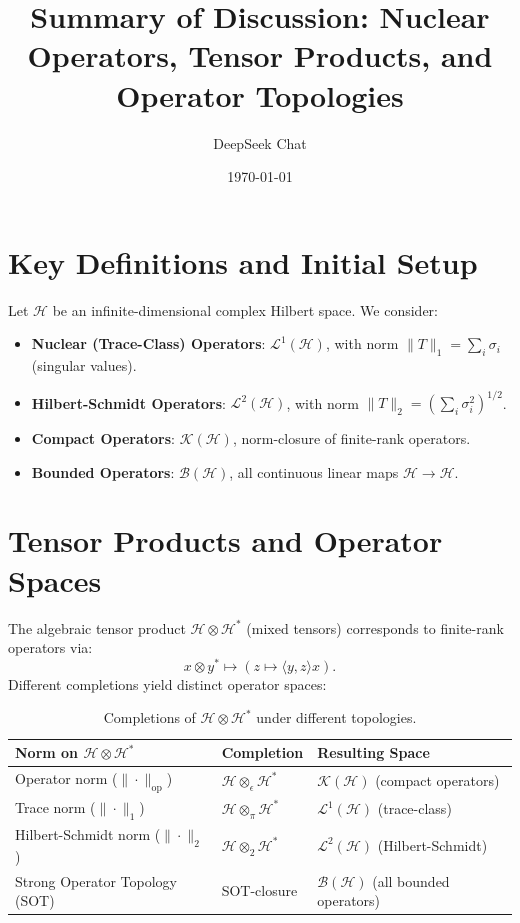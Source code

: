 \documentclass[aps,preprint]{revtex4}
\title{Summary of Discussion: Nuclear Operators, Tensor Products, and Operator Topologies}
\author{DeepSeek Chat}
\date{\today}
\newcommand{\HH}{\mathcal{H}}
\newcommand{\BB}{\mathcal{B}}
\newcommand{\KK}{\mathcal{K}}
\newcommand{\LL}{\mathcal{L}}
\newcommand{\ot}{\otimes}
\begin{document}
\maketitle

\section{Key Definitions and Initial Setup}
Let \(\HH\) be an infinite-dimensional complex Hilbert space. We consider:
\begin{itemize}
    \item \textbf{Nuclear (Trace-Class) Operators}: \(\LL^1(\HH)\), with norm \(\|T\|_1 = \sum_i \sigma_i\) (singular values).
    \item \textbf{Hilbert-Schmidt Operators}: \(\LL^2(\HH)\), with norm \(\|T\|_2 = \left(\sum_i \sigma_i^2\right)^{1/2}\).
    \item \textbf{Compact Operators}: \(\KK(\HH)\), norm-closure of finite-rank operators.
    \item \textbf{Bounded Operators}: \(\BB(\HH)\), all continuous linear maps \(\HH \to \HH\).
\end{itemize}

\section{Tensor Products and Operator Spaces}
The algebraic tensor product \(\HH \ot \HH^*\) (mixed tensors) corresponds to finite-rank operators via:
\[
x \ot y^* \mapsto \left( z \mapsto \langle y, z \rangle x \right).
\]
Different completions yield distinct operator spaces:
\begin{table}[h]
    \centering
    \begin{tabular}{|l|l|l|}
        \hline
        \textbf{Norm on \(\HH \ot \HH^*\)} & \textbf{Completion} & \textbf{Resulting Space} \\ \hline
        Operator norm (\(\|\cdot\|_{\text{op}}\)) & \(\HH \ot_\epsilon \HH^*\) & \(\KK(\HH)\) (compact operators) \\ \hline
        Trace norm (\(\|\cdot\|_1\)) & \(\HH \ot_\pi \HH^*\) & \(\LL^1(\HH)\) (trace-class) \\ \hline
        Hilbert-Schmidt norm (\(\|\cdot\|_2\)) & \(\HH \ot_2 \HH^*\) & \(\LL^2(\HH)\) (Hilbert-Schmidt) \\ \hline
        Strong Operator Topology (SOT) & SOT-closure & \(\BB(\HH)\) (all bounded operators) \\ \hline
    \end{tabular}
    \caption{Completions of \(\HH \ot \HH^*\) under different topologies.}
\end{table}
\end{document}
